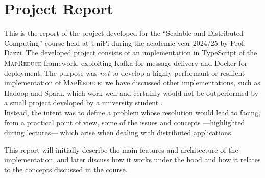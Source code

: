 \chapter{Project Report}

This is the report of the project developed for the ``Scalable and Distributed Computing'' course held at UniPi during the academic year 2024/25 by Prof. Dazzi.
The developed project consists of an implementation in TypeScript of the \textsc{MapReduce} framework, exploiting Kafka for message delivery and Docker for deployment.
The purpose was \textit{not} to develop a highly performant or resilient implementation of \textsc{MapReduce}; we have discussed other implementations, such as Hadoop and Spark, which work well and certainly would not be outperformed by a small project developed by a university student \smiley. \\
Instead, the intent was to define a problem whose resolution would lead to facing, from a practical point of view, some of the issues and concepts ---highlighted during lectures--- which arise when dealing with distributed applications.

\nl
\nl

This report will initially describe the main features and architecture of the implementation, and later discuss how it works under the hood and how it relates to the concepts discussed in the course.

\nl
\nl

